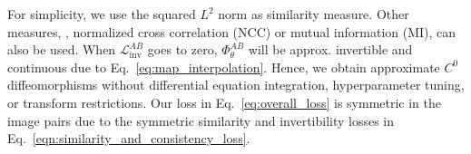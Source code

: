 \documentclass[10pt,twocolumn,letterpaper]{article} %
\begin{document}
For simplicity, we use the squared $L^2$ norm as similarity measure. Other measures, \eg, normalized cross correlation (NCC) or mutual information (MI), can also be used. When $\mathcal{L}_{\text{inv}}^{AB}$ goes to zero, $\Phi_\theta^{AB}$ will be approx. invertible and continuous due to Eq.~\eqref{eq:map_interpolation}. Hence, we obtain approximate $C^0$ diffeomorphisms without  differential equation integration,  hyperparameter tuning, or transform restrictions. Our loss in Eq.~\eqref{eq:overall_loss} is symmetric in the image pairs due to the symmetric similarity and invertibility losses in Eq.~\eqref{eqn:similarity_and_consistency_loss}.





%
\end{document}
